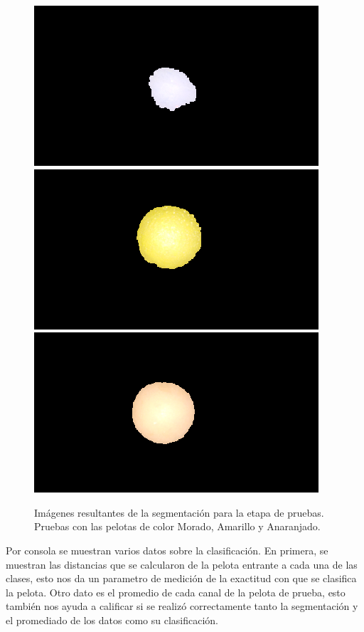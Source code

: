 \documentclass[conference]{IEEEtran}
\begin{document}
\begin{figure}[h]
	\setlength{\unitlength}{0.0105in}
	\centering
	\includegraphics[scale=0.41]{./images/test1.png}
	\includegraphics[scale=0.41]{./images/test2.png}
	\includegraphics[scale=0.41]{./images/test3.png}
	\caption{ Im\'agenes resultantes de la segmentaci\'on para la etapa de pruebas. Pruebas con las pelotas de color Morado, Amarillo y Anaranjado. }
\end{figure}

\newpage
Por consola se muestran varios datos sobre la clasificaci\'on. En primera, se muestran las distancias que se calcularon de la pelota entrante a cada una de las clases, esto nos da un parametro de medici\'on de la exactitud con que se clasifica la pelota. Otro dato es el promedio de cada canal de la pelota de prueba, esto tambi\'en nos ayuda a calificar si se realiz\'o correctamente tanto la segmentaci\'on y el promediado de los datos como su clasificaci\'on.\\
\end{document}
